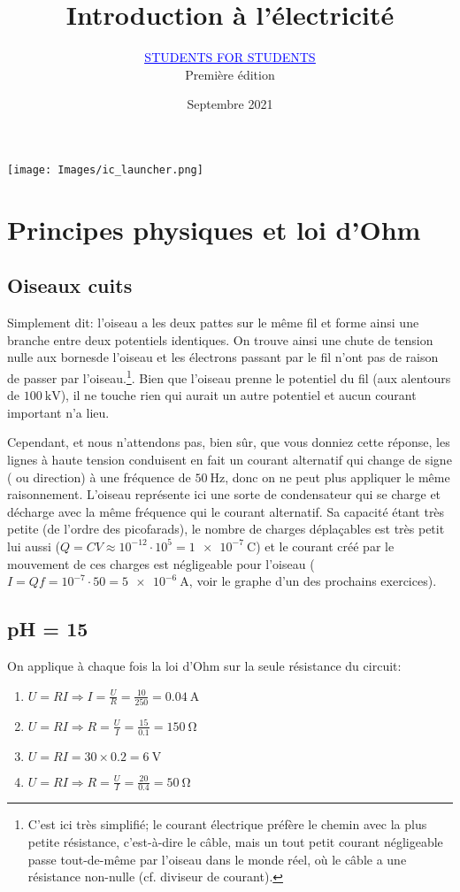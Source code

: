 \documentclass{article}
\title{Introduction à l'électricité}
\author{\href{https://s4s.fun}{\textcolor{blue}{\underline{STUDENTS FOR STUDENTS}}}\\Première édition}
\date{Septembre 2021}
\begin{document}
\maketitle

\begin{center}
   \texttt{[image: Images/ic\_launcher.png]} 
\end{center}
\vfill
\tableofcontents
\vfill
\newpage

\setlength{\parskip}{1ex}

\section{Principes physiques et loi d'Ohm}

\subsection{Oiseaux cuits}
Simplement dit: l'oiseau a les deux pattes sur le même fil et forme ainsi une branche entre deux potentiels identiques. On trouve ainsi une chute de tension nulle aux \og bornes\fg de l'oiseau et les électrons passant par le fil n'ont pas de raison de passer par l'oiseau.\footnote{C'est ici très simplifié; le courant électrique préfère le chemin avec la plus petite résistance, c'est-à-dire le câble, mais un tout petit courant négligeable passe tout-de-même par l'oiseau dans le monde réel, où le câble a une résistance non-nulle (cf. diviseur de courant).}. Bien que l'oiseau prenne le potentiel du fil (aux alentours de $\SI{100}{\kilo\volt}$), il ne touche rien qui aurait un autre potentiel et aucun courant important n'a lieu.

Cependant, et nous n'attendons pas, bien sûr, que vous donniez cette réponse, les lignes à haute tension conduisent en fait un courant alternatif qui change de signe ( ou direction) à une fréquence de $\SI{50}{\hertz}$, donc on ne peut plus appliquer le même raisonnement. L'oiseau représente ici une sorte de condensateur qui se charge et décharge avec la même fréquence qui le courant alternatif. Sa capacité étant très petite (de l'ordre des picofarads), le nombre de charges déplaçables est très petit lui aussi ($Q=CV\approx10^{-12}\cdot10^5=\SI{1e-7}{\coulomb}$) et le courant créé par le mouvement de ces charges est négligeable pour l'oiseau ($I=Qf=10^{-7}\cdot 50=\SI{5e-6}{\ampere}$, voir le graphe d'un des prochains exercices).

\subsection{pH = 15}
On applique à chaque fois la loi d'Ohm sur la seule résistance du circuit:
\begin{enumerate}
    \item $U=RI\Rightarrow I=\frac{U}{R}=\frac{10}{250}=\SI{0.04}{\ampere}$
    \item $U=RI\Rightarrow R=\frac{U}{I}=\frac{15}{0.1}=\SI{150}{\ohm}$
    \item $U=RI=30\times 0.2=\SI{6}{\volt}$
    \item $U=RI\Rightarrow R=\frac{U}{I}=\frac{20}{0.4}=\SI{50}{\ohm}$
\end{enumerate}
\end{document}
